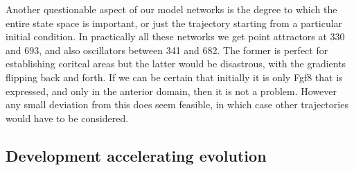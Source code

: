 \documentclass[a4paper,11pt]{article}
\begin{document}

Another questionable aspect of our model networks is the degree to which the entire state space is important, or just the trajectory starting from a particular initial condition. In practically all these networks we get point attractors at 330 and 693, and also oscillators between 341 and 682. The former is perfect for establishing coritcal areas but the latter would be disastrous, with the gradients flipping back and forth. If we can be certain that initially it is only Fgf8 that is expressed, and only in the anterior domain, then it is not a problem. However any small deviation from this does seem feasible, in which case other trajectories would have to be considered.
\par

\subsection{Development accelerating evolution}
\end{document}
